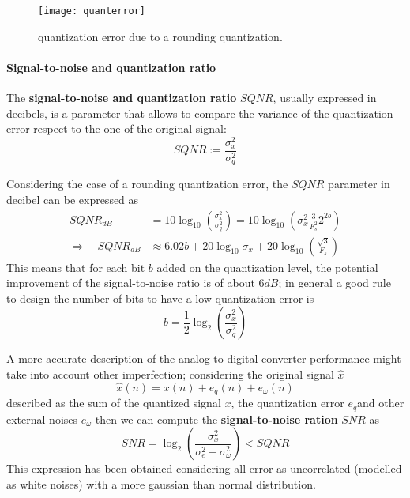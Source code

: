			\begin{SCfigure}[2][bht]
				\centering
				\texttt{[image: quanterror]}
				\caption{quantization error due to a rounding quantization.} \label{fig:conv:quantizationerror}
			\end{SCfigure}
			
			\paragraph{Signal-to-noise and quantization ratio} The \textbf{signal-to-noise and quantization ratio} $SQNR$, usually expressed in decibels, is a parameter that allows to compare the variance of the quantization error respect to the one of the original signal:
			\begin{equation}
				SQNR := \frac{\sigma_x^2}{\sigma_q^2}
			\end{equation}
			
			Considering the case of a rounding quantization error, the $SQNR$ parameter in decibel can be expressed as
			\begin{equation}
			\begin{aligned}
				SQNR_{dB} & = 10 \log_{10}\left(\frac{\sigma_x^2}{\sigma_q^2}\right) = 10 \log_{10} \left( \sigma_x^2 \frac 3 {F_s^2} 2^{2b} \right) \\ \Rightarrow \quad SQNR_{dB}  & \approx 6.02b + 20\log_{10}\sigma_x + 20\log_{10} \left( \frac{\sqrt 3}{F_s} \right)
			\end{aligned}
			\end{equation}
			This means that for each bit $b$ added on the quantization level, the potential improvement of the signal-to-noise ratio is of about $6dB$; in general a good rule to design the number of bits to have a low quantization error is
			\begin{equation}
				b = \frac 1 2 \log_2 \left( \frac{\sigma_x^2}{\sigma_q^2} \right)
			\end{equation}
			
			A more accurate description of the analog-to-digital converter performance might take into account other imperfection; considering the original signal $\hat x$
			\[ \hat x(n) = x(n) + e_q(n) + e_\omega(n) \]
			described as the sum of the quantized signal $x$, the quantization error $e_q$and other external noises $e_\omega$ then we can compute the \textbf{signal-to-noise ration} $SNR$ as
			\begin{equation}
				SNR = \log_2 \left( \frac{\sigma_x^2}{\sigma_e^2 + \sigma_\omega^2} \right) < SQNR
			\end{equation}
			This expression has been obtained considering all error as uncorrelated (modelled as white noises) with a more gaussian than normal distribution.
			
